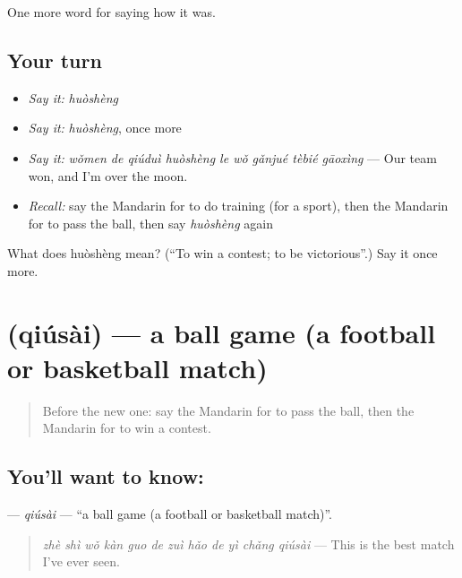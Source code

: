 \begin{grammarlens}[title={What you've built}]
One more word for saying how it was.
\end{grammarlens}

\subsection*{Your turn}
\begin{itemize}
\raggedright
  \item \emph{Say it:} \emph{huòshèng}
  \item \emph{Say it:} \emph{huòshèng}, once more
  \item \emph{Say it:} \emph{wǒmen de qiúduì huòshèng le wǒ gǎnjué tèbié gāoxìng} — Our team won, and I'm over the moon.
  \item \emph{Recall:} say the Mandarin for to do training (for a sport), then the Mandarin for to pass the ball, then say \emph{huòshèng} again
\end{itemize}

\begin{tcolorbox}[breakable,colback=teal!4,colframe=teal!35!black,title={Before you move on}]
What does huòshèng mean? (\textquotedblleft{}To win a contest; to be victorious\textquotedblright{}.) Say it once more.
\end{tcolorbox}
\section[\texorpdfstring{\zh{球赛} (qiúsài)}{球赛 (qiúsài)}]{ (qiúsài) — a ball game (a football or basketball match)}

\label{lesson:ZH-C500-qiusai}



\begin{quote}
Before the new one: say the Mandarin for to pass the ball, then the Mandarin for to win a contest.
\end{quote}

\subsection*{You'll want to know: }
\textbf{} — \emph{qiúsài} — \textquotedblleft{}a ball game (a football or basketball match)\textquotedblright{}.

\begin{quote}
\textbf{} \emph{zhè shì wǒ kàn guo de zuì hǎo de yì chǎng qiúsài} — This is the best match I've ever seen.
\end{quote}

